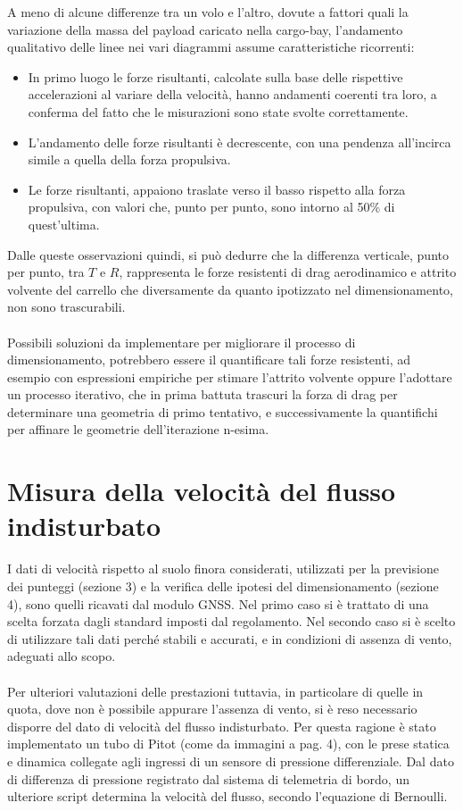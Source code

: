 \documentclass[12pt]{article}
\begin{document}
\noindent
A meno di alcune differenze tra un volo e l'altro, dovute a fattori quali la variazione della massa del payload caricato nella cargo-bay, l'andamento qualitativo delle linee nei vari diagrammi assume caratteristiche ricorrenti:
\begin{itemize}
\item In primo luogo le forze risultanti, calcolate sulla base delle rispettive accelerazioni al variare della velocità, hanno andamenti coerenti tra loro, a conferma del fatto che le misurazioni sono state svolte correttamente.
\item L'andamento delle forze risultanti è decrescente, con una pendenza all'incirca simile a quella della forza propulsiva.
\item Le forze risultanti, appaiono traslate verso il basso rispetto alla forza propulsiva, con valori che, punto per punto, sono intorno al 50\% di quest'ultima.
\end{itemize}
Dalle queste osservazioni quindi, si può dedurre che la differenza verticale, punto per punto, tra $T$ e $R$, rappresenta le forze resistenti di drag aerodinamico e attrito volvente del carrello che diversamente da quanto ipotizzato nel dimensionamento, non sono trascurabili.
\\\\
Possibili soluzioni da implementare per migliorare il processo di dimensionamento, potrebbero essere il quantificare tali forze resistenti, ad esempio con espressioni empiriche per stimare l'attrito volvente oppure l'adottare un processo iterativo, che in prima battuta trascuri la forza di drag per determinare una geometria di primo tentativo, e successivamente la quantifichi per affinare le geometrie dell'iterazione n-esima.

\section{Misura della velocità del flusso indisturbato}
I dati di velocità rispetto al suolo finora considerati, utilizzati per la previsione dei punteggi (sezione 3) e la verifica delle ipotesi del dimensionamento (sezione 4), sono quelli ricavati dal modulo GNSS. Nel primo caso si è trattato di una scelta forzata dagli standard imposti dal regolamento. Nel secondo caso si è scelto di utilizzare tali dati perché stabili e accurati, e in condizioni di assenza di vento, adeguati allo scopo.
\\\\
Per ulteriori valutazioni delle prestazioni tuttavia, in particolare di quelle in quota, dove non è possibile appurare l'assenza di vento, si è reso necessario disporre del dato di velocità del flusso indisturbato. Per questa ragione è stato implementato un tubo di Pitot (come da immagini a pag. 4), con le prese statica e dinamica collegate agli ingressi di un sensore di pressione differenziale. Dal dato di differenza di pressione registrato dal sistema di telemetria di bordo, un ulteriore script determina la velocità del flusso, secondo l'equazione di Bernoulli.
\end{document}
